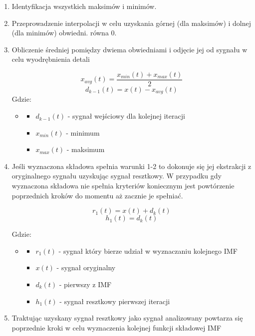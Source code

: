 \documentclass[a4paper]{article}
\begin{document}
\begin{enumerate}
	\item Identyfikacja wszystkich maksimów i minimów. 
	\item Przeprowadzenie interpolacji  w celu uzyskania górnej (dla maksimów) i dolnej (dla minimów) obwiedni. równa 0.
	\item Obliczenie średniej pomiędzy dwiema obwiedniami i odjęcie jej od sygnału w celu wyodrębnienia detali

\begin{equation} 
  x_{avg}(t) = \frac{x_{min}(t) +x_{max}(t)}{2}
 \end{equation}
\begin{equation}
  d_{k-1}(t) = x(t) - x_{avg}(t)
 \end{equation}
Gdzie:
\begin{itemize}
	\item[] 
	\begin{itemize}
	 	\item[] $d_{k-1}(t)$ - sygnał wejściowy dla kolejnej iteracji
		\item[] $x_{min}(t)$ - minimum
		\item[] $x_{max}(t)$ - maksimum
	\end{itemize}
\end{itemize}

	\item Jeśli wyznaczona składowa spełnia warunki 1-2 to dokonuje się jej ekstrakcji z oryginalnego sygnału uzyskując sygnał resztkowy. W przypadku gdy wyznaczona składowa nie spełnia kryteriów koniecznym jest powtórzenie poprzednich kroków do momentu aż zacznie je spełniać.

\begin{equation} 
  r_{1}(t) = x(t) +d_{k}(t)
 \end{equation}
\begin{equation}
  h_{1}(t) = d_{k}(t)
 \end{equation}

Gdzie:
\begin{itemize}
	\item[] 
	\begin{itemize}
	 	\item[] $r_{1}(t)$ - sygnał który bierze udział w wyznaczaniu kolejnego IMF
		\item[] $x(t)$ - sygnał oryginalny
		\item[] $d_{k}(t)$ - pierwszy z IMF
		\item[] $h_{1}(t)$ - sygnał resztkowy pierwszej iteracji
	\end{itemize}
\end{itemize}

	\item Traktując uzyskany sygnał resztkowy jako sygnał analizowany powtarza się poprzednie kroki w celu wyznaczenia kolejnej funkcji składowej IMF
\end{enumerate}
\end{document}
